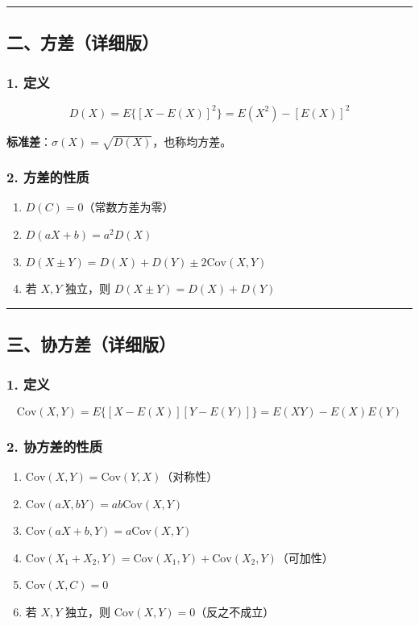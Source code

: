 \documentclass[12pt,a4paper]{ctexart}
\begin{document}
\vspace{1em}\hrule\vspace{1em}

\subsection{二、方差（详细版）}

\subsubsection{1. 定义}
\[ D(X) = E\{[X - E(X)]^2\} = E(X^2) - [E(X)]^2 \]

\textbf{标准差}：$\sigma(X) = \sqrt{D(X)}$，也称均方差。

\subsubsection{2. 方差的性质}
\begin{enumerate}[noitemsep]
    \item $D(C) = 0$（常数方差为零）
    \item $D(aX + b) = a^2 D(X)$
    \item $D(X \pm Y) = D(X) + D(Y) \pm 2\text{Cov}(X, Y)$
    \item 若 $X, Y$ 独立，则 $D(X \pm Y) = D(X) + D(Y)$
\end{enumerate}

\vspace{1em}\hrule\vspace{1em}

\subsection{三、协方差（详细版）}

\subsubsection{1. 定义}
\[ \text{Cov}(X, Y) = E\{[X - E(X)][Y - E(Y)]\} = E(XY) - E(X)E(Y) \]

\subsubsection{2. 协方差的性质}
\begin{enumerate}[noitemsep]
    \item $\text{Cov}(X, Y) = \text{Cov}(Y, X)$（对称性）
    \item $\text{Cov}(aX, bY) = ab\text{Cov}(X, Y)$
    \item $\text{Cov}(aX + b, Y) = a\text{Cov}(X, Y)$
    \item $\text{Cov}(X_1 + X_2, Y) = \text{Cov}(X_1, Y) + \text{Cov}(X_2, Y)$（可加性）
    \item $\text{Cov}(X, C) = 0$
    \item 若 $X, Y$ 独立，则 $\text{Cov}(X, Y) = 0$（反之不成立）
\end{enumerate}
\end{document}
